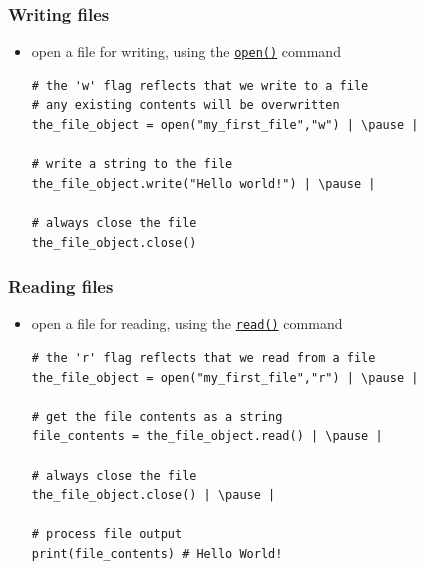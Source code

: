 \documentclass[xcolor=table]{beamer}
\begin{document}
\begin{frame}[fragile]
    \frametitle{Writing files}
\begin{itemize}
    \item open a file for writing, using the \href{https://docs.python.org/3/library/functions.html#open}{\texttt{open()}} command \pause
\begin{lstlisting}[style=python]
# the 'w' flag reflects that we write to a file
# any existing contents will be overwritten
the_file_object = open("my_first_file","w") | \pause |

# write a string to the file
the_file_object.write("Hello world!") | \pause |

# always close the file
the_file_object.close()
\end{lstlisting}
\end{itemize}
\end{frame}


\begin{frame}[fragile]
    \frametitle{Reading files}
\begin{itemize}
    \item open a file for reading, using the \href{https://docs.python.org/3/library/functions.html#read}{\texttt{read()}} command \pause
\begin{lstlisting}[style=python]
# the 'r' flag reflects that we read from a file
the_file_object = open("my_first_file","r") | \pause |

# get the file contents as a string
file_contents = the_file_object.read() | \pause |

# always close the file
the_file_object.close() | \pause |

# process file output
print(file_contents) # Hello World!
\end{lstlisting}
\end{itemize}
\end{frame}

\end{document}
